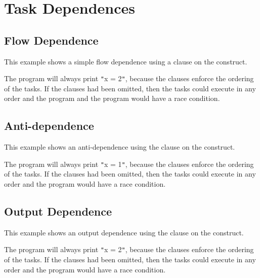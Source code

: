 \pagebreak
\section{Task Dependences}
\label{sec:task_depend}

\subsection{Flow Dependence}
\label{subsec:task_flow_depend}

This example shows a simple flow dependence using a  
clause on the  construct.



The program will always print \texttt{"}x = 2\texttt{"}, because the  
clauses enforce the ordering of the tasks. If the  clauses had been 
omitted, then the tasks could execute in any order and the program and the program 
would have a race condition.

\subsection{Anti-dependence}
\label{subsec:task_anti_depend}

This example shows an anti-dependence using the  
clause on the  construct.



The program will always print \texttt{"}x = 1\texttt{"}, because the  
clauses enforce the ordering of the tasks. If the  clauses had been 
omitted, then the tasks could execute in any order and the program would have a 
race condition.

\subsection{Output Dependence}
\label{subsec:task_out_depend}

This example shows an output dependence using the  
clause on the  construct.



The program will always print \texttt{"}x = 2\texttt{"}, because the  
clauses enforce the ordering of the tasks. If the  clauses had been 
omitted, then the tasks could execute in any order and the program would have a 
race condition.

